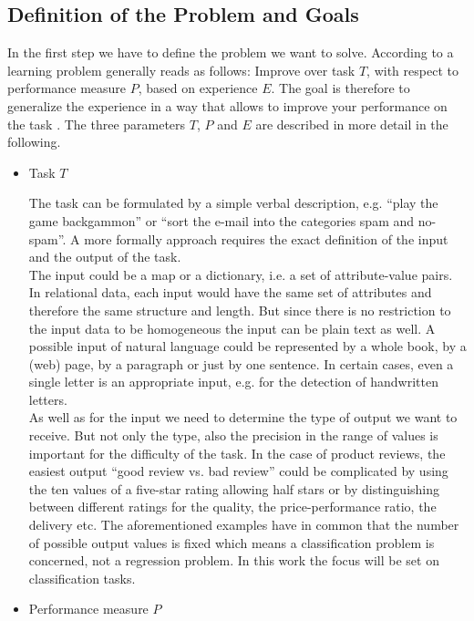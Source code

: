 \documentclass[article,type=msc,colorback,accentcolor=tud7b]{tudthesis}
\begin{document}
  \subsection{Definition of the Problem and Goals}
  \label{subsec:definition_of_the_problem_and_goals}
    In the first step we have to define the problem we want to solve. According to \citeauthor{Mitchell1997} a learning problem generally reads as follows: Improve over task $T$, with respect to performance measure $P$, based on experience $E$. The goal is therefore to generalize the experience in a way that allows to improve your performance on the task \autocite[Chapter~1]{Mitchell1997}. The three parameters $T$, $P$ and $E$ are described in more detail in the following.
    \begin{itemize}
      \item Task $T$
      
        The task can be formulated by a simple verbal description, e.g. “play the game backgammon” or “sort the e-mail into the categories spam and no-spam”. A more formally approach requires the exact definition of the input and the output of the task. \\
        The input could be a map or a dictionary, i.e. a set of attribute-value pairs. In relational data, each input would have the same set of attributes and therefore the same structure and length. But since there is no restriction to the input data to be homogeneous the input can be plain text as well. A possible input of natural language could be represented by a whole book, by a (web) page, by a paragraph or just by one sentence. In certain cases, even a single letter is an appropriate input, e.g. for the detection of handwritten letters. \\
        As well as for the input we need to determine the type of output we want to receive. But not only the type, also the precision in the range of values is important for the difficulty of the task. In the case of product reviews, the easiest output “good review vs. bad review” could be complicated by using the ten values of a five-star rating allowing half stars or by distinguishing between different ratings for the quality, the price-performance ratio, the delivery etc. The aforementioned examples have in common that the number of possible output values is fixed which means a classification problem is concerned, not a regression problem. In this work the focus will be set on classification tasks.
      \item Performance measure $P$
      

\end{itemize}
\end{document}
